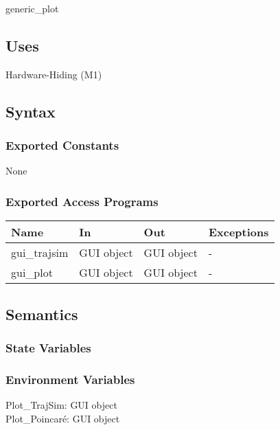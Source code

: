 \documentclass[12pt, titlepage]{article}
\begin{document}
generic\_plot

\subsection{Uses}

Hardware-Hiding (M1)

\subsection{Syntax}

\subsubsection{Exported Constants}

None

\subsubsection{Exported Access Programs}

\begin{center}
\begin{tabular}{p{2cm} p{4cm} p{4cm} p{2cm}}
\hline
\textbf{Name} & \textbf{In} & \textbf{Out} & \textbf{Exceptions} \\
\hline
gui\_trajsim & GUI object & GUI object & - \\
gui\_plot & GUI object & GUI object & - \\
\hline
\end{tabular}
\end{center}

\subsection{Semantics}

\subsubsection{State Variables}

\subsubsection{Environment Variables}

\noindent Plot{\_}TrajSim: GUI object\\
Plot{\_}Poincar\'{e}: GUI object\\
\end{document}
